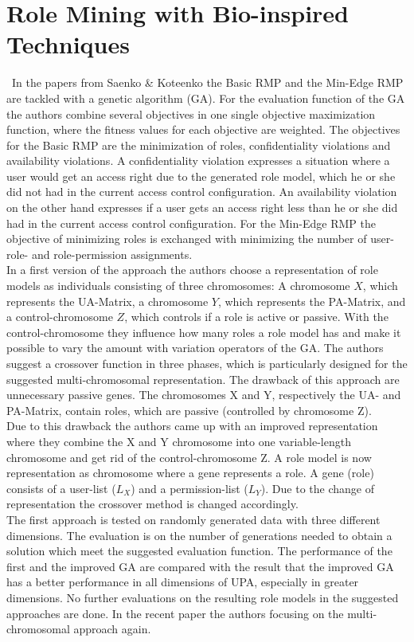 \section{Role Mining with Bio-inspired Techniques}
\label{sec:relatedWork3}\
In the papers from Saenko \& Koteenko \cite{Igor} \cite{saenko2012design} the Basic RMP and the Min-Edge RMP are tackled with a genetic algorithm (GA). For the evaluation function of the GA the authors combine several objectives in one single objective maximization function, where the fitness values for each objective are weighted. The objectives for the Basic RMP are the minimization of roles, confidentiality violations and availability violations. A confidentiality violation expresses a situation where a user would get an access right due to the generated role model, which he or she did not had in the current access control configuration. An availability violation on the other hand expresses if a user gets an access right less than he or she did had in the current access control configuration. For the Min-Edge RMP the objective of minimizing roles is exchanged with minimizing the number of user-role- and role-permission assignments.\\
In a first version of the approach the authors choose a representation of role models as individuals consisting of three chromosomes: A chromosome $X$, which represents the UA-Matrix, a chromosome $Y$, which represents the PA-Matrix, and a control-chromosome $Z$, which controls if a role is active or passive. With the control-chromosome they influence how many roles a role model has and make it possible to vary the amount with variation operators of the GA. The authors suggest a crossover function in three phases, which is particularly designed for the suggested multi-chromosomal representation. The drawback of this approach are unnecessary passive genes. The chromosomes X and Y, respectively the UA- and PA-Matrix, contain roles, which are passive (controlled by chromosome Z).\\
Due to this drawback the authors came up with an improved representation where they combine the X and Y chromosome into one variable-length chromosome and get rid of the control-chromosome Z. A role model is now representation as chromosome where a gene represents a role. A gene (role) consists of a user-list ($L_X$) and a permission-list ($L_Y$). Due to the change of representation the crossover method is changed accordingly.\\
The first approach is tested on randomly generated data with three different dimensions\cite{Igor}. The evaluation is on the number of generations needed to obtain a solution which meet the suggested evaluation function. The performance of the first and the improved GA are compared with the result that the improved GA has a better performance in all dimensions of UPA, especially in greater dimensions\cite{saenko2012design}. No further evaluations on the resulting role models in the suggested approaches are done. In the recent paper \cite{Kotenko:2015} the authors focusing on the multi-chromosomal approach again.\\
